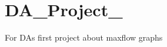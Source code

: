 \chapter{DA\+\_\+\+Project\+\_}
\hypertarget{md_README}{}\label{md_README}
\label{md_README_autotoc_md1}%
%
For DA\textquotesingle{}s first project about maxflow graphs 